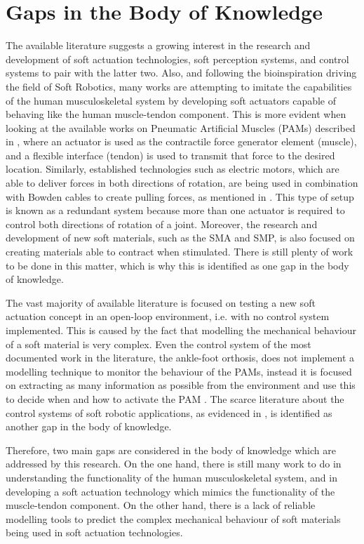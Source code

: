\section{Gaps in the Body of Knowledge} \label{sec:gaps}

The available literature suggests a growing interest in the research and development of soft actuation technologies, soft perception systems, and control systems to pair with the latter two. Also, and following the bioinspiration driving the field of Soft Robotics, many works are attempting to imitate the capabilities of the human musculoskeletal system by developing soft actuators capable of behaving like the human muscle-tendon component. This is more evident when looking at the available works on Pneumatic Artificial Muscles (PAMs) described in , where an actuator is used as the contractile force generator element (muscle), and a flexible interface (tendon) is used to transmit that force to the desired location. Similarly, established technologies such as electric motors, which are able to deliver forces in both directions of rotation, are being used in combination with Bowden cables to create pulling forces, as mentioned in . This type of setup is known as a redundant system because more than one actuator is required to control both directions of rotation of a joint. Moreover, the research and development of new soft materials, such as the SMA and SMP, is also focused on creating materials able to contract when stimulated. There is still plenty of work to be done in this matter, which is why this is identified as one gap in the body of knowledge.

The vast majority of available literature is focused on testing a new soft actuation concept in an open-loop environment, i.e. with no control system implemented. This is caused by the fact that modelling the mechanical behaviour of a soft material is very complex. Even the control system of the most documented work in the literature, the ankle-foot orthosis, does not implement a modelling technique to monitor the behaviour of the PAMs, instead it is focused on extracting as many information as possible from the environment and use this to decide when and how to activate the PAM \cite{park2011bio}. The scarce literature about the control systems of soft robotic applications, as evidenced in , is identified as another gap in the body of knowledge.

Therefore, two main gaps are considered in the body of knowledge which are addressed by this research. On the one hand, there is still many work to do in understanding the functionality of the human musculoskeletal system, and in developing a soft actuation technology which mimics the functionality of the muscle-tendon component. On the other hand, there is a lack of reliable modelling tools to predict the complex mechanical behaviour of soft materials being used in soft actuation technologies. 

